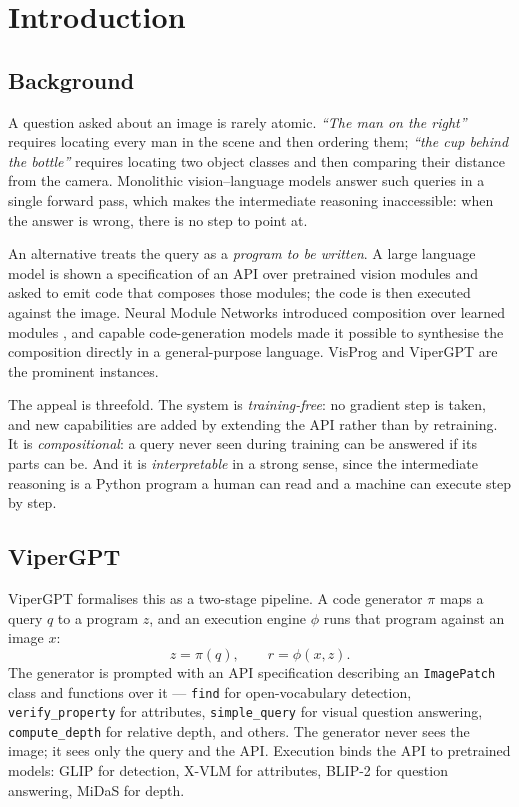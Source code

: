 \documentclass[12pt,a4paper,oneside]{report}
\begin{document}
\tableofcontents
\listoffigures
\listoftables

\cleardoublepage
{}
\setcounter{page}{1}

\chapter{Introduction}
\label{ch:introduction}

\section{Background}

A question asked about an image is rarely atomic. \emph{``The man on the right''}
requires locating every man in the scene and then ordering them; \emph{``the cup
behind the bottle''} requires locating two object classes and then comparing their
distance from the camera. Monolithic vision--language models answer such queries in a
single forward pass, which makes the intermediate reasoning inaccessible: when the
answer is wrong, there is no step to point at.

An alternative treats the query as a \emph{program to be written}. A large language
model is shown a specification of an API over pretrained vision modules and asked to
emit code that composes those modules; the code is then executed against the image.
Neural Module Networks introduced composition over learned modules
\cite{andreas2016nmn}, and capable code-generation models made it possible to
synthesise the composition directly in a general-purpose language. VisProg
\cite{gupta2023visprog} and ViperGPT \cite{suris2023vipergpt} are the prominent
instances.

The appeal is threefold. The system is \emph{training-free}: no gradient step is
taken, and new capabilities are added by extending the API rather than by retraining.
It is \emph{compositional}: a query never seen during training can be answered if its
parts can be. And it is \emph{interpretable} in a strong sense, since the intermediate
reasoning is a Python program a human can read and a machine can execute step by step.

\section{ViperGPT}

ViperGPT formalises this as a two-stage pipeline. A code generator $\pi$ maps a query
$q$ to a program $z$, and an execution engine $\phi$ runs that program against an
image $x$:
\[
    z = \pi(q), \qquad r = \phi(x, z).
\]
The generator is prompted with an API specification describing an \texttt{ImagePatch}
class and functions over it --- \texttt{find} for open-vocabulary detection,
\texttt{verify\_property} for attributes, \texttt{simple\_query} for visual question
answering, \texttt{compute\_depth} for relative depth, and others. The generator never
sees the image; it sees only the query and the API. Execution binds the API to
pretrained models: GLIP \cite{li2022glip} for detection, X-VLM \cite{zeng2022xvlm}
for attributes, BLIP-2 \cite{li2023blip2} for question answering, MiDaS
\cite{ranftl2020midas} for depth.
\end{document}
